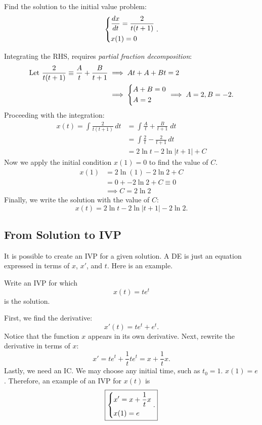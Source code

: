 \documentclass[letterpaper]{article}
\begin{document}
\begin{example}[3]{    
Find the solution to the initial value problem:
\[
\begin{dcases}
    \frac{dx}{dt}= \frac{2}{t(t+1)}\\
    x(1) = 0
\end{dcases}.
\]
}

Integrating the RHS, requires \textit{partial fraction decomposition}:
\begin{align*}
\text{Let } \frac{2}{t(t+1)} \equiv \frac{A}{t}+ \frac{B}{t+1} &\implies At+A+Bt=2\\
                                                  &\implies \begin{dcases}
                                                      A+B=0\\
                                                      A=2
                                                  \end{dcases}\implies A=2,B=-2.
\end{align*}
Proceeding with the integration:
\begin{align*}    
x(t) = \int \frac{2}{t(t+1)}\,dt &= \int\frac{A}{t}+ \frac{B}{t+1} \;dt\\ 
    &=\int\frac{2}{t}- \frac{2}{t+1}\,dt\\
    &=2\ln t-2\ln|t+1|+C
\end{align*}
Now we apply the initial condition $x(1)=0$ to find the value of $C$. 
\begin{align*}    
x(1) &=2\ln (1)-2\ln2+C\\
 &=0+ -2\ln2 +C \equiv 0 \\
&\implies  C = 2\ln2
\end{align*}
Finally, we write the solution with the value of $C$:
\[
\boxed{
x(t) =2\ln t-2\ln|t+1|-2\ln 2.
}
\]
\end{example}

\subsection{From Solution to IVP}

It is possible to create an IVP for a given solution. A DE is just an equation expressed in terms of $x$, $x'$, and $t$. Here is an example. 

\begin{example}[4]{
Write an IVP for which  
\[ x(t) = te^t\]
is the solution. 
}
    
First, we find the derivative:
\[
    x'(t) = te^t + e^t.
\]
Notice that the function $x$ appears in its own derivative. 
Next, rewrite the derivative in terms of $x$:
\[
x' = te^t + \frac{1}{t} te^t = x + \frac{1}{t}x.
\]
Lastly, we need an IC. We may choose any initial time, such as $t_0=1$. $x(1)=e$. Therefore, an example of an IVP for $x(t)$ is
\[
\boxed{
\begin{dcases}
    x' = x + \frac{1}{t}x\\
    x(1)=e
\end{dcases}.
}
\]
\end{example}
\end{document}
